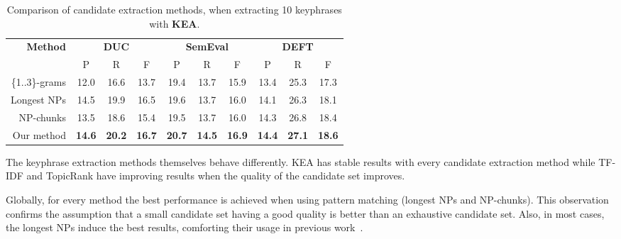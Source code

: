       \begin{table}
        \centering
        \begin{tabular}{rccccccccc}
          \toprule
          \multirow{2}{*}[-2pt]{\textbf{Method}} & \multicolumn{3}{c}{\textbf{DUC}} & \multicolumn{3}{c}{\textbf{SemEval}} & \multicolumn{3}{c}{\textbf{DEFT}}\\
          \cmidrule(r){2-4}\cmidrule(lr){5-7}\cmidrule(l){8-10}
          & P & R & F & P & R & F & P & R & F\\
          \midrule
          \{1..3\}-grams & 12.0 & 16.6 & 13.7 & 19.4 & 13.7 & 15.9 & 13.4 & 25.3 & 17.3\\
          Longest NPs & 14.5 & 19.9 & 16.5 & 19.6 & 13.7 & 16.0 & 14.1 & 26.3 & 18.1\\
          NP-chunks & 13.5 & 18.6 & 15.4 & 19.5 & 13.7 & 16.0 & 14.3 & 26.8 & 18.4\\
          Our method & \textbf{14.6} & \textbf{20.2} & \textbf{16.7} & \textbf{20.7} & \textbf{14.5} & \textbf{16.9} & \textbf{14.4} & \textbf{27.1} & \textbf{18.6}\\
          \bottomrule
        \end{tabular}
        \caption{Comparison of candidate extraction methods, when extracting 10
                 keyphrases with \textbf{KEA}.
                 \label{tab:kea_results}}
      \end{table}
      
      The keyphrase extraction methods themselves behave differently. KEA has
      stable results with every candidate extraction method while TF-IDF and
      TopicRank have improving results when the quality of the candidate set
      improves.

      Globally, for every method the best performance is achieved when using
      pattern matching (longest NPs and NP-chunks). This observation confirms
      the assumption that a small candidate set having a good quality is better
      than an exhaustive candidate set. Also, in most cases, the longest NPs
      induce the best results, comforting their usage in previous
      work~\cite{wan2008expandrank,hassan2010conundrums,bougouin2013topicrank}.

